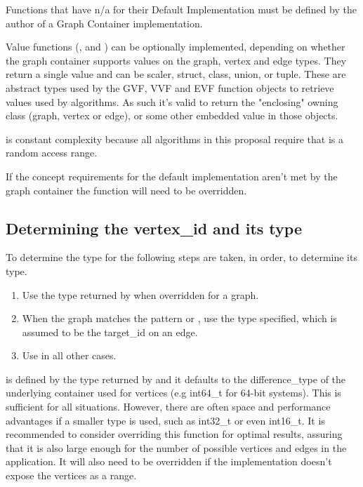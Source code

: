 Functions that have n/a for their Default Implementation must be defined by the author of a Graph Container implementation. 

Value functions (,  and ) can be optionally implemented, 
depending on whether the graph container supports values on the graph, vertex and edge types. They return a single value and can 
be scaler, struct, class, union, or tuple. These are abstract types used by the GVF, VVF and EVF function objects to retrieve
values used by algorithms. As such it's valid to return the "enclosing" owning class (graph, vertex or edge), or some other
embedded value in those objects.

 is constant complexity because all algorithms in this proposal require that  is a random access range. 

If the concept requirements for the default implementation aren't met by the graph container the function will need to be overridden.

\subsection{Determining the vertex\_id and its type}
To determine the type for  the following steps are taken, in order, to determine its type.
\begin{enumerate}
    \item Use the type returned by  when overridden for a graph.
    \item When the graph matches the pattern  or ,
          use the  type specified, which is assumed to be the target\_id on an edge.
    \item Use  in all other cases.
\end{enumerate}

 is defined by the type returned by  and it defaults to the difference\_type of the underlying container used for vertices (e.g int64\_t for 64-bit systems). 
This is sufficient for all situations. However, there are often space and performance advantages if a smaller type is used, such as int32\_t or even int16\_t. It is recommended to consider overriding 
this function for optimal results, assuring that it is also large enough for the number of possible vertices and edges in the application. It will also need to be overridden if the implementation doesn't 
expose the vertices as a range.

